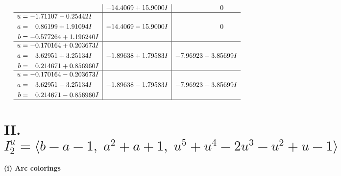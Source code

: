 \documentclass[1p]{elsarticle_modified}
\theoremstyle{definition}
\begin{document}
$$\begin{array}{c|c|c}
 & -14.4069 + 15.9000 I & \phantom{-0.000000 } 0 \\ \hline\begin{aligned}
u &= -1.71107 - 0.25442 I \\
a &= \phantom{-}0.86199 + 1.91094 I \\
b &= -0.577264 + 1.196240 I\end{aligned}
 & -14.4069 - 15.9000 I & \phantom{-0.000000 } 0 \\ \hline\begin{aligned}
u &= -0.170164 + 0.203673 I \\
a &= \phantom{-}3.62951 + 3.25134 I \\
b &= \phantom{-}0.214671 + 0.856960 I\end{aligned}
 & -1.89638 + 1.79583 I & -7.96923 - 3.85699 I \\ \hline\begin{aligned}
u &= -0.170164 - 0.203673 I \\
a &= \phantom{-}3.62951 - 3.25134 I \\
b &= \phantom{-}0.214671 - 0.856960 I\end{aligned}
 & -1.89638 - 1.79583 I & -7.96923 + 3.85699 I\\
 \hline 
 \end{array}$$\newpage\newpage\renewcommand{\arraystretch}{1}
\centering \section*{II. $I^u_{2}= \langle b- a-1,\;a^2+a+1,\;u^5+u^4-2 u^3- u^2+u-1 \rangle$}
\flushleft \textbf{(i) Arc colorings}\\
\end{document}
